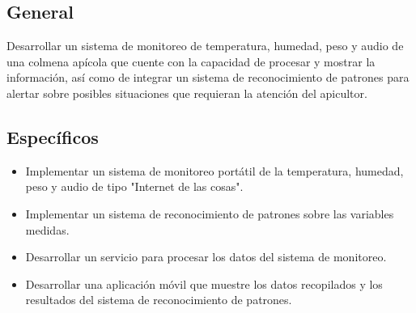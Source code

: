 
\subsection{General}
Desarrollar un sistema de monitoreo de temperatura, humedad, peso y audio de una colmena apícola que cuente con la capacidad de procesar y mostrar la información, así como de integrar un sistema de reconocimiento de patrones para alertar sobre posibles situaciones que requieran la atención del apicultor.

\subsection{Específicos}
\begin{itemize}
    \item Implementar un sistema de monitoreo portátil de la temperatura, humedad, peso y audio de tipo "Internet de las cosas".
    \item Implementar un sistema de reconocimiento de patrones sobre las variables medidas.
    \item Desarrollar un servicio para procesar los datos del sistema de monitoreo.
    \item Desarrollar una aplicación móvil que muestre los datos recopilados y los resultados del sistema de reconocimiento de patrones.
\end{itemize}
